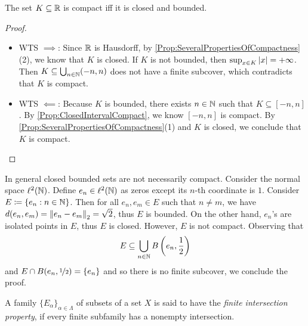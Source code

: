 \documentclass[screen,single]{techreport}
\numberwithin{equation}{section}
\begin{document}
\begin{theorem}\label{The:HeineBorelProperty}
	The set $K \subseteq \mathbb{R}$ is compact iff it is closed and bounded.
\end{theorem}
\begin{proof}\
	\begin{itemize}
		\item WTS ${\implies}$: Since $\mathbb{R}$ is Hausdorff, by \cref{Prop:SeveralPropertiesOfCompactness}(2), we know that $K$ is closed.
		If $K$ is not bounded, then $\sup_{x \in K} \left|{x}\right| = +\infty$.
		Then $K \subseteq \bigcup_{n \in \mathbb{N}} (-n,n)$ does not have a finite subcover, which contradicts that $K$ is compact.
		
		\item WTS ${\impliedby}$: Because $K$ is bounded, there exists $n \in \mathbb{N}$ such that $K \subseteq [-n,n]$.
		By \cref{Prop:ClosedIntervalCompact}, we know $[-n,n]$ is compact.
		By \cref{Prop:SeveralPropertiesOfCompactness}(1) and $K$ is closed, we conclude that $K$ is compact.
	\end{itemize}
\end{proof}

\begin{example}\label{Exa:ClosedBoundedNotCompact}
	In general closed bounded sets are not necessarily compact.
	Consider the normal space $\ell^2(\mathbb{N})$.
	Define $e_n \in \ell^2(\mathbb{N})$ as zeros except its $n$-th coordinate is $1$.
	Consider $E \coloneqq \left\{ {e_n : n \in \mathbb{N}} \right\}$.
	Then for all $e_n,e_m \in E$ such that $n\ne m$, we have $d(e_n,e_m) = \left\|{e_n - e_m}\right\|_2 = \sqrt{2}$, thus $E$ is bounded.
	On the other hand, $e_n$'s are isolated points in $E$, thus $E$ is closed.
	However, $E$ is not compact.
	Observing that
	\[
	E \subseteq \bigcup_{n \in \mathbb{N}} B\left({e_n, \frac{1}{2}}\right)
	\]
	and $E \cap B(e_n,\nicefrac{1}{2}) = \{ e_n \}$ and so there is no finite subcover,
	we conclude the proof.
\end{example}

\begin{definition}\label{De:FiniteIntersectionProperty}
	A family $\{E_\alpha\}_{\alpha \in \Lambda}$ of subsets of a set $X$ is said to have the \emph{finite intersection property}, if every finite subfamily has a nonempty intersection.
\end{definition}
\end{document}

